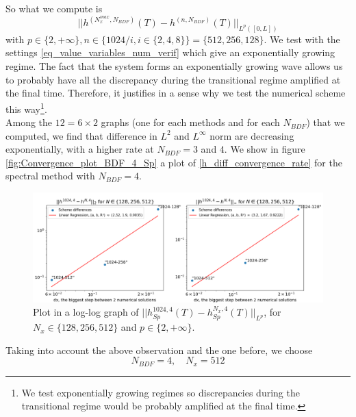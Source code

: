 \documentclass[12pt]{article}
\begin{document}
So what we compute is 
\begin{equation}\label{h_diff_convergence_rate}
    ||h^{(N_x^{max}, N_{BDF})}(T)-h^{(n, N_{BDF})}(T)||_{L^{p}([0,L])}
\end{equation}
with $p\in \{2, +\infty\},n\in \{1024/i, i\in \{2, 4, 8\}\} = \{512, 256, 128\}.$
We test with the settings \eqref{eq_value_variables_num_verif} which give an exponentially growing regime. The fact that
 the system forms an exponentially growing wave allows us to probably have all the discrepancy during the transitional
  regime amplified at the final time. Therefore, it justifies in a sense why we test the numerical scheme this 
  way\footnote{We test exponentially growing regimes so discrepancies during the transitional regime would be probably
   amplified at the final time.}.
\\

Among the $12=6\times2$ graphs (one for each methods and for each $N_{BDF}$) that we computed, we find that difference in $L^2$ and $L^{\infty}$ norm are decreasing exponentially, with a higher rate at $N_{BDF}=3$ and $4$. We show in figure \eqref{fig:Convergence_plot_BDF_4_Sp} a plot of \eqref{h_diff_convergence_rate} for the spectral method with $N_{BDF}=4.$
\\

\begin{figure}
    \begin{center}
        \includegraphics[width=\linewidth]{Verif_scheme/Convergence_graph_Sp_method.png}
    \end{center}
    \caption{Plot in a log-log graph of $||h_{Sp}^{1024,4}(T)-h_{Sp}^{N_x, 4}(T)||_{L^p}$, for $N_x \in \{128, 256, 512\}$ and $p \in \{2, +\infty\}$.}
    \label{fig:Convergence_plot_BDF_4_Sp}
\end{figure}

Taking into account the above observation and the one before, we choose 
\begin{equation}\label{var_final_config_tests}
\boxed{
    N_{BDF} = 4, \quad N_x = 512
}
\end{equation}
\end{document}
